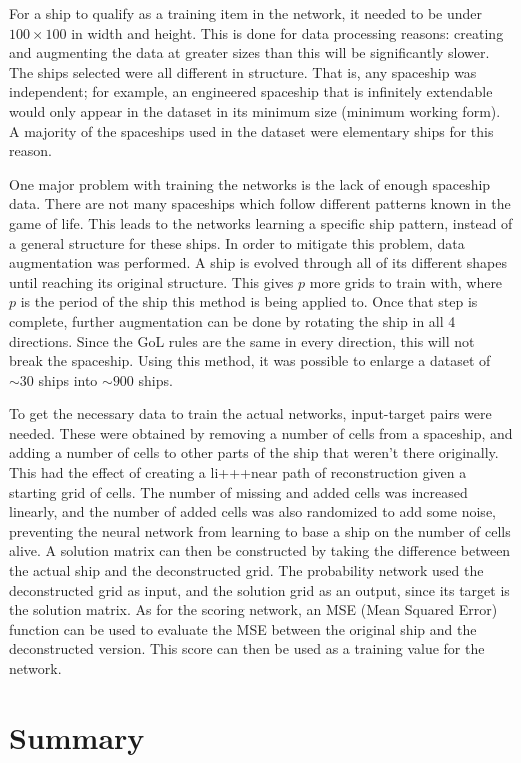 \documentclass{l4proj}
\begin{document}
For a ship to qualify as a training item in the network, it needed to be under $100 \times 100$ in width and height. This is done for data processing reasons: creating and augmenting the data at greater sizes than this will be significantly slower. The ships selected were all different in structure. That is, any spaceship was independent; for example, an engineered spaceship that is infinitely extendable would only appear in the dataset in its minimum size (minimum working form). A majority of the spaceships used in the dataset were elementary ships for this reason.

One major problem with training the networks is the lack of enough spaceship data. There are not many spaceships which follow different patterns known in the game of life. This leads to the networks learning a specific ship pattern, instead of a general structure for these ships. In order to mitigate this problem, data augmentation was performed. A ship is evolved through all of its different shapes until reaching its original structure. This gives $p$ more grids to train with, where $p$ is the period of the ship this method is being applied to. Once that step is complete, further augmentation can be done by rotating the ship in all 4 directions. Since the GoL rules are the same in every direction, this will not break the spaceship. Using this method, it was possible to enlarge a dataset of $\sim 30$ ships into $\sim 900$ ships.

To get the necessary data to train the actual networks, input-target pairs were needed. These were obtained by removing a number of cells from a spaceship, and adding a number of cells to other parts of the ship that weren't there originally. This had the effect of creating a li+++near path of reconstruction given a starting grid of cells. The number of missing and added cells was increased linearly, and the number of added cells was also randomized to add some noise, preventing the neural network from learning to base a ship on the number of cells alive. A solution matrix can then be constructed by taking the difference between the actual ship and the deconstructed grid. The probability network used the deconstructed grid as input, and the solution grid as an output, since its target is the solution matrix. As for the scoring network, an MSE (Mean Squared Error) function can be used to evaluate the MSE between the original ship and the deconstructed version. This score can then be used as a training value for the network. 

\section{Summary}
\end{document}
